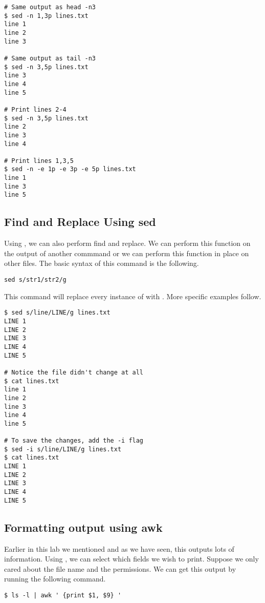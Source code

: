 \begin{lstlisting}
# Same output as head -n3
$ sed -n 1,3p lines.txt
line 1
line 2
line 3

# Same output as tail -n3
$ sed -n 3,5p lines.txt
line 3
line 4
line 5

# Print lines 2-4
$ sed -n 3,5p lines.txt
line 2
line 3
line 4

# Print lines 1,3,5
$ sed -n -e 1p -e 3p -e 5p lines.txt 
line 1
line 3
line 5
\end{lstlisting}  

\subsection*{Find and Replace Using sed}

Using , we can also perform find and replace. We can perform this function on the output of another commmand or we can perform this function in place on other files. The basic syntax of this  command is the following.

\begin{lstlisting}
sed s/str1/str2/g
\end{lstlisting} 

This command will replace every instance of  with . More specific examples follow.

\begin{lstlisting}
$ sed s/line/LINE/g lines.txt
LINE 1
LINE 2
LINE 3
LINE 4
LINE 5

# Notice the file didn't change at all
$ cat lines.txt
line 1
line 2
line 3
line 4
line 5

# To save the changes, add the -i flag
$ sed -i s/line/LINE/g lines.txt
$ cat lines.txt
LINE 1
LINE 2
LINE 3
LINE 4
LINE 5
\end{lstlisting}

\subsection*{Formatting output using awk}
Earlier in this lab we mentioned  and as we have seen, this outputs lots of information. Using , we can select which fields we wish to print. Suppose we only cared about the file name and the permissions. We can get this output by running the following command.

\begin{lstlisting}
$ ls -l | awk ' {print $1, $9} '
\end{lstlisting}

